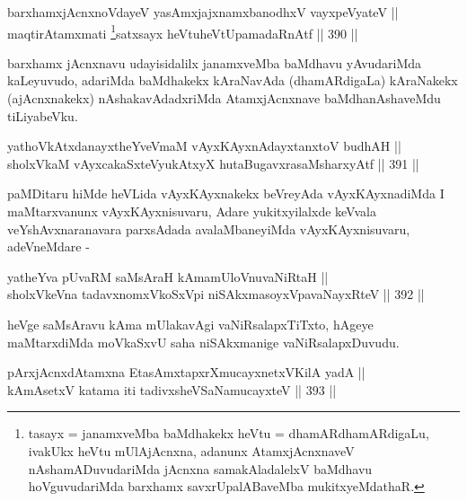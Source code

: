 
\begin{shl}
barxhamxjAcnxnoVdayeV yasAmxjajxnamxbanodhxV vayxpeVyateV ||  \\
maqtirAtamxmati \footnote{tasayx = janamxveMba baMdhakekx heVtu = dhamARdhamARdigaLu,
ivakUkx heVtu mUlAjAcnxna, adanunx AtamxjAcnxnaveV
nAshamADuvudariMda jAcnxna samakAladalelxV baMdhavu hoVguvudariMda
barxhamx savxrUpalABaveMba mukitxyeMdathaR.}satxsayx heVtuheVtUpamadaRnAtf \hfill || 390 ||  
\end{shl}


\begin{artha}
barxhamx jAcnxnavu udayisidalilx janamxveMba baMdhavu yAvudariMda
kaLeyuvudo, adariMda baMdhakekx kAraNavAda (dhamARdigaLa) kAraNakekx
(ajAcnxnakekx) nAshakavAdadxriMda AtamxjAcnxnave baMdhanAshaveMdu
tiLiyabeVku.
\end{artha}


\begin{shl}
yathoVkAtxdanayxtheYveVmaM vAyxKAyxnAdayxtanxtoV budhAH ||  \\
sholxVkaM vAyxcakaSxteV\s yukAtxyX hutaBugavxrasaMsharxyAtf \hfill || 391 ||  
\end{shl}

\begin{artha}
paMDitaru hiMde heVLida vAyxKAyxnakekx beVreyAda vAyxKAyxnadiMda I
maMtarxvanunx vAyxKAyxnisuvaru, Adare yukitxyilalxde keVvala
veYshAvxnaranavara parxsAdada avalaMbaneyiMda vAyxKAyxnisuvaru, adeVneMdare  -
\end{artha}

\begin{shl}
yatheYva pUvaRM saMsAraH kAmamUloV\s nuvaNiRtaH || \\
sholxVkeVna tadavxnomxVkoSxV\s pi niSAkxmasoyxVpavaNayxRteV \hfill || 392 ||  
\end{shl}

\begin{artha}
heVge saMsAravu kAma mUlakavAgi vaNiRsalapxTiTxto, hAgeye maMtarxdiMda
moVkaSxvU saha niSAkxmanige vaNiRsalapxDuvudu.
\end{artha}


\begin{shl}
pArxjAcnxdAtamxna EtasAmxtapxrXmucayxnetxV\s KilA yadA || \\
kAmAsetxV katama iti tadivxsheVSaNamucayxteV \hfill || 393 ||  
\end{shl}


